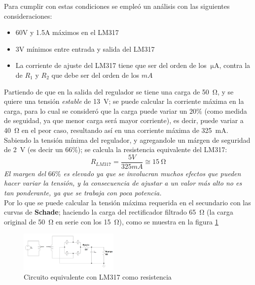 \documentclass[letterpaper, 10 pt, conference]{ieeeconf}  %
\begin{document}
Para cumplir con estas condiciones se empleó un análisis con las siguientes consideraciones:
\begin{itemize}
  \item{60V y 1.5A máximos en el LM317}
  \item{3V mínimos entre entrada y salida del LM317}
  \item{La corriente de ajuste del LM317 tiene que ser del orden de los $\qty{}{\micro\ampere}$, contra la de $R_1$ y $R_2$ que debe ser del orden de los $mA$}
\end{itemize}

Partiendo de que en la salida del regulador se tiene una carga de \qty{50}{\ohm}, y se quiere una tensión \textit{estable} de \qty{13}{\volt}; se puede calcular la corriente máxima en la carga, para lo cual se consideró que la carga puede variar un $20\%$ (como medida de seguidad, ya que menor carga será mayor corriente), es decir, puede variar a \qty{40}{\ohm} en el peor caso, resultando así en una corriente máxima de \qty{325}{\milli\ampere}. \\
Sabiendo la tensión mínima del regulador, y agregandole un márgen de seguridad de \qty{2}{\volt} (es decir un $66\%$); se calcula la resistencia equivalente del LM317: 
\begin{equation} \label{eq:lm317_resistance}
  R_{LM317} = \frac{5V}{325mA} \cong \qty{15}{\ohm}
\end{equation}
\textit{El margen del $66\%$ es elevado ya que se involucran muchos efectos que pueden hacer variar la tensión, y la consecuencia de ajustar a un valor más alto no es tan ponderante, ya que se trabaja con poca potencia.} \\

Por lo que se puede calcular la tensión máxima requerida en el secundario con las curvas de \textbf{Schade}; haciendo la carga del rectificador filtrado \qty{65}{\ohm} (la carga original de \qty{50}{\ohm} en serie con los \qty{15}{\ohm}), como se muestra en la figura \ref{fig:lm317_como_resistencia}
\begin{figure}[H]
  \centering
  \includegraphics[width=0.43\textwidth]{./imagenes/circ_eq_lm137_carga.png}
  \caption{Circuito equivalente con LM317 como resistencia}
  \label{fig:lm317_como_resistencia}
\end{figure}
\end{document}
